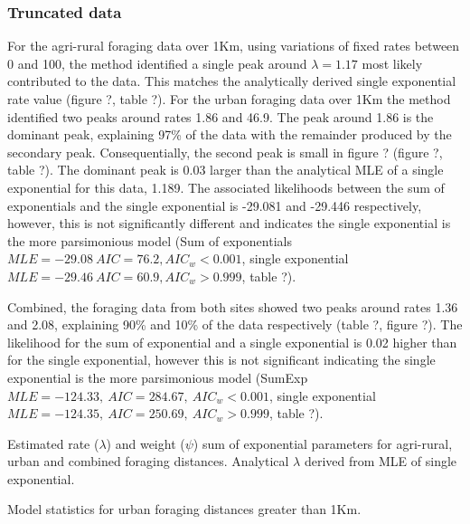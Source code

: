 \documentclass[11pt,usenames,dvipsnames]{article}
\begin{document}
\subsubsection{Truncated data}

\begin{linenumbers}
\hspace{\parindent}
For the agri-rural foraging data over 1Km, using variations of fixed rates between 0 and 100, the method identified a single peak around $\lambda = 1.17$ most likely contributed to the data. This matches the analytically derived single exponential rate value (figure ?, table ?). For the urban foraging data over 1Km the method identified two peaks around rates 1.86 and 46.9. The peak around 1.86 is the dominant peak, explaining 97\% of the data with the remainder produced by the secondary peak. Consequentially, the second peak is small in figure ? (figure ?, table ?). The dominant peak is 0.03 larger than the analytical MLE of a single exponential for this data, 1.189. The associated likelihoods between the sum of exponentials and the single exponential is -29.081 and -29.446 respectively, however, this is not significantly different and indicates the single exponential is the more parsimonious model (Sum of exponentials $MLE = -29.08\ AIC = 76.2, AIC_w < 0.001$, single exponential $MLE = -29.46\ AIC = 60.9, AIC_w > 0.999$, table ?). 

Combined, the foraging data from both sites showed two peaks around rates 1.36 and 2.08, explaining 90\% and 10\% of the data respectively (table ?, figure ?). The likelihood for the sum of exponential and a single exponential is 0.02 higher than for the single exponential, however this is not significant indicating the single exponential is the more parsimonious model (SumExp $MLE = -124.33,\ AIC = 284.67,\ AIC_w < 0.001$, single exponential $MLE = -124.35,\ AIC = 250.69,\ AIC_w > 0.999$, table ?).
\end{linenumbers}

\begin{table}[H]
	\centering
	\caption{Estimated rate ($\lambda$) and weight ($\psi$) sum of exponential parameters for agri-rural, urban and combined foraging distances. Analytical $\lambda$ derived from MLE of single exponential.}
	
\end{table}

\begin{table}[H]
	\centering
	\caption{Model statistics for urban foraging distances greater than 1Km.}
	
\end{table}
\end{document}
